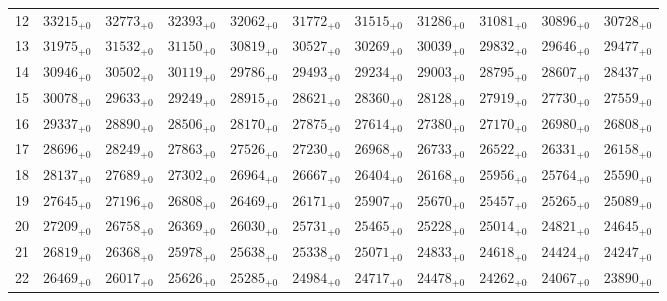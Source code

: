 \documentclass[10pt, a4paper]{article}
\begin{document}
\begin{center}
\begin{tabular}{c || c c c c c | c c c c c}
        12 & \({33215}_{+0}\) & \({32773}_{+0}\) & \({32393}_{+0}\) & \({32062}_{+0}\) & \({31772}_{+0}\) & \({31515}_{+0}\) & \({31286}_{+0}\) & \({31081}_{+0}\) & \({30896}_{+0}\) & \({30728}_{+0}\)\\
        13 & \({31975}_{+0}\) & \({31532}_{+0}\) & \({31150}_{+0}\) & \({30819}_{+0}\) & \({30527}_{+0}\) & \({30269}_{+0}\) & \({30039}_{+0}\) & \({29832}_{+0}\) & \({29646}_{+0}\) & \({29477}_{+0}\)\\
        14 & \({30946}_{+0}\) & \({30502}_{+0}\) & \({30119}_{+0}\) & \({29786}_{+0}\) & \({29493}_{+0}\) & \({29234}_{+0}\) & \({29003}_{+0}\) & \({28795}_{+0}\) & \({28607}_{+0}\) & \({28437}_{+0}\)\\
        15 & \({30078}_{+0}\) & \({29633}_{+0}\) & \({29249}_{+0}\) & \({28915}_{+0}\) & \({28621}_{+0}\) & \({28360}_{+0}\) & \({28128}_{+0}\) & \({27919}_{+0}\) & \({27730}_{+0}\) & \({27559}_{+0}\)\\
        \hline
        16 & \({29337}_{+0}\) & \({28890}_{+0}\) & \({28506}_{+0}\) & \({28170}_{+0}\) & \({27875}_{+0}\) & \({27614}_{+0}\) & \({27380}_{+0}\) & \({27170}_{+0}\) & \({26980}_{+0}\) & \({26808}_{+0}\)\\
        17 & \({28696}_{+0}\) & \({28249}_{+0}\) & \({27863}_{+0}\) & \({27526}_{+0}\) & \({27230}_{+0}\) & \({26968}_{+0}\) & \({26733}_{+0}\) & \({26522}_{+0}\) & \({26331}_{+0}\) & \({26158}_{+0}\)\\
        18 & \({28137}_{+0}\) & \({27689}_{+0}\) & \({27302}_{+0}\) & \({26964}_{+0}\) & \({26667}_{+0}\) & \({26404}_{+0}\) & \({26168}_{+0}\) & \({25956}_{+0}\) & \({25764}_{+0}\) & \({25590}_{+0}\)\\
        19 & \({27645}_{+0}\) & \({27196}_{+0}\) & \({26808}_{+0}\) & \({26469}_{+0}\) & \({26171}_{+0}\) & \({25907}_{+0}\) & \({25670}_{+0}\) & \({25457}_{+0}\) & \({25265}_{+0}\) & \({25089}_{+0}\)\\
        20 & \({27209}_{+0}\) & \({26758}_{+0}\) & \({26369}_{+0}\) & \({26030}_{+0}\) & \({25731}_{+0}\) & \({25465}_{+0}\) & \({25228}_{+0}\) & \({25014}_{+0}\) & \({24821}_{+0}\) & \({24645}_{+0}\)\\
        \hline
        21 & \({26819}_{+0}\) & \({26368}_{+0}\) & \({25978}_{+0}\) & \({25638}_{+0}\) & \({25338}_{+0}\) & \({25071}_{+0}\) & \({24833}_{+0}\) & \({24618}_{+0}\) & \({24424}_{+0}\) & \({24247}_{+0}\)\\
        22 & \({26469}_{+0}\) & \({26017}_{+0}\) & \({25626}_{+0}\) & \({25285}_{+0}\) & \({24984}_{+0}\) & \({24717}_{+0}\) & \({24478}_{+0}\) & \({24262}_{+0}\) & \({24067}_{+0}\) & \({23890}_{+0}\)\\

\end{tabular}
\end{center}
\end{document}
